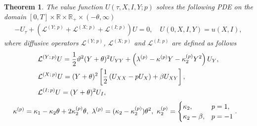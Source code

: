 \documentclass[11pt,a4paper] {article}
\newtheorem{theorem}{Theorem}[section]
\begin{document}
\begin{theorem}\label{thm:FeynmannKac}
The value function $U(\tau,X,I,Y; p)$ solves the following PDE on the domain $[0,T]\times\mathbb{R}\times\mathbb{R}_{+}\times(-\theta,\infty)$
\begin{equation}\label{eq:pdeY}
\begin{split}
-U_{\tau} +\left( \mathcal{L}^{(Y;\,p)} + \mathcal{L}^{(X;\,p)} + \mathcal{L}^{(I;\,p)} \right)U =0, \quad U(0,X,I,Y)=u(X,I),
\end{split}
\end{equation}
where diffusive operators $\mathcal{L}^{(Y;\,p)}$, $\mathcal{L}^{(X;\,p)}$ and $\mathcal{L}^{(I;\,p)}$ are defined as follows
\begin{equation} \label{eq:pdeLY1}
\begin{split}
&\mathcal{L}^{(Y;\,p)}U= \frac{1}{2} \vartheta^{2} (Y+\theta)^{2} U_{YY}+\left(\lambda^{(p)} - \kappa^{(p)} Y   - \kappa_{2}^{(p)}Y^{2}\right)U_{Y},\\
&\mathcal{L}^{(X;\,p)}U= (Y+\theta)^{2} \left[ \frac{1}{2}\left( U_{XX} -p U_{X} \right)+\beta U_{XY}\right],\\
&\mathcal{L}^{(I;\,p)}U= (Y+\theta)^{2}U_{I},\vspace*{-1\baselineskip}
\end{split}
\end{equation}\vspace*{-1.0\baselineskip}
\begin{equation*}\vspace*{-1.0\baselineskip}
\begin{split}
& \kappa^{(p)}=\kappa_1-\kappa_2\theta+2\kappa_2^{(p)} \theta, \ \lambda^{(p)}=(\kappa_2-\kappa_2^{(p)})\theta^2, \ \kappa_2^{(p)}=
\begin{cases}
\kappa_2,& p=1,\\
\kappa_2-\beta,& p=-1\\
\end{cases}.
\end{split}
\end{equation*}
\end{theorem}
\end{document}
